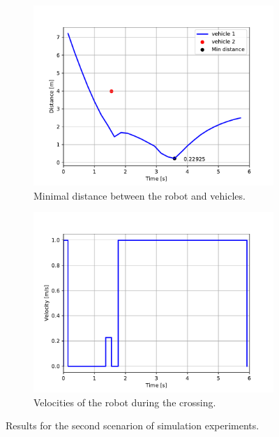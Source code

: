             \begin{figure}[ht]
                \centering
                \begin{subfigure}{0.49\linewidth}
                    \centering
                    \includegraphics[trim={24 8 40 41}, clip, width=\linewidth]{images/simulations/scene2_2_dist.pdf}
                    \caption{Minimal distance between the robot and vehicles.}
                \end{subfigure}
                \begin{subfigure}{0.49\linewidth}
                    \centering
                    \includegraphics[trim={21 8 40 41}, clip, width=\linewidth]{images/simulations/scene2_2_vel.pdf}
                    \caption{Velocities of the robot during the crossing.}
                \end{subfigure}
                \caption{Results for the second scenarion of simulation experiments.}
                \label{fig:scene2_2_graphs}
            \end{figure}
